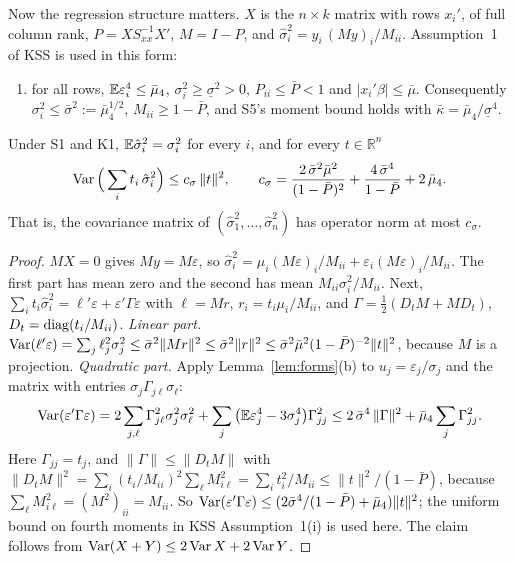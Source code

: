 Now the regression structure matters. $X$ is the $n\times k$ matrix with rows $x_i'$, of full column rank,
$P=XS_{xx}^{-1}X'$, $M=I-P$, and $\hat\sigma_i^2=y_i\,(My)_i/M_{ii}$. Assumption~1 of KSS is used in this form:
\begin{enumerate}[label=\textbf{(K\arabic*)},leftmargin=3.3em,itemsep=3pt]
\item for all rows, $\mathbb{E}\varepsilon_i^4\le\bar\mu_4$, $\sigma_i^2\ge\underline\sigma^2>0$, $P_{ii}\le\bar P<1$ and
$|x_i'\beta|\le\bar\mu$. Consequently $\sigma_i^2\le\bar\sigma^2:=\bar\mu_4^{1/2}$, $M_{ii}\ge1-\bar P$, and S5's
moment bound holds with $\bar\kappa=\bar\mu_4/\underline\sigma^4$.
\end{enumerate}

\begin{lemma}\label{lem:kssvar}
Under S1 and K1, $\mathbb{E}\hat\sigma_i^2=\sigma_i^2$ for every $i$, and for every $t\in\mathbb{R}^n$
\[
\operatorname{Var}\Big(\sum_it_i\,\hat\sigma_i^2\Big)\le c_\sigma\,\|t\|^2,\qquad
c_\sigma=\frac{2\,\bar\sigma^2\bar\mu^2}{(1-\bar P)^2}+\frac{4\,\bar\sigma^4}{1-\bar P}+2\,\bar\mu_4 .
\]
That is, the covariance matrix of $(\hat\sigma_1^2,\dots,\hat\sigma_n^2)$ has operator norm at most $c_\sigma$.
\end{lemma}

\begin{proof}
$MX=0$ gives $My=M\varepsilon$, so
$\hat\sigma_i^2=\mu_i(M\varepsilon)_i/M_{ii}+\varepsilon_i(M\varepsilon)_i/M_{ii}$. The first part has
mean zero and the second has mean $M_{ii}\sigma_i^2/M_{ii}$. Next,
$\sum_it_i\hat\sigma_i^2=\ell'\varepsilon+\varepsilon'\Gamma\varepsilon$ with $\ell=Mr$,
$r_i=t_i\mu_i/M_{ii}$, and $\Gamma=\frac12(D_tM+MD_t)$, $D_t=\operatorname{diag}(t_i/M_{ii})$.
\emph{Linear part.} $\operatorname{Var}(\ell'\varepsilon)=\sum_j\ell_j^2\sigma_j^2\le\bar\sigma^2\|Mr\|^2\le\bar\sigma^2\|r\|^2
\le\bar\sigma^2\bar\mu^2(1-\bar P)^{-2}\|t\|^2$, because $M$ is a projection.
\emph{Quadratic part.} Apply Lemma~\ref{lem:forms}(b) to $u_j=\varepsilon_j/\sigma_j$ and the matrix
with entries $\sigma_j\Gamma_{j\ell}\sigma_\ell$:
\[
\operatorname{Var}(\varepsilon'\Gamma\varepsilon)=2\sum_{j,\ell}\Gamma_{j\ell}^2\sigma_j^2\sigma_\ell^2+\sum_j\big(\mathbb{E}\varepsilon_j^4-3\sigma_j^4\big)\Gamma_{jj}^2
\le2\,\bar\sigma^4\,\|\Gamma\|^2+\bar\mu_4\sum_j\Gamma_{jj}^2 .
\]
Here $\Gamma_{jj}=t_j$, and $\|\Gamma\|\le\|D_tM\|$ with
$\|D_tM\|^2=\sum_i(t_i/M_{ii})^2\sum_\ell M_{i\ell}^2=\sum_it_i^2/M_{ii}\le\|t\|^2/(1-\bar P)$, because
$\sum_\ell M_{i\ell}^2=(M^2)_{ii}=M_{ii}$. So
$\operatorname{Var}(\varepsilon'\Gamma\varepsilon)\le(2\bar\sigma^4/(1-\bar P)+\bar\mu_4)\|t\|^2$; the uniform bound
on fourth moments in KSS Assumption~1(i) is used here. The claim follows from
$\operatorname{Var}(X+Y)\le2\operatorname{Var} X+2\operatorname{Var} Y$.
\end{proof}

